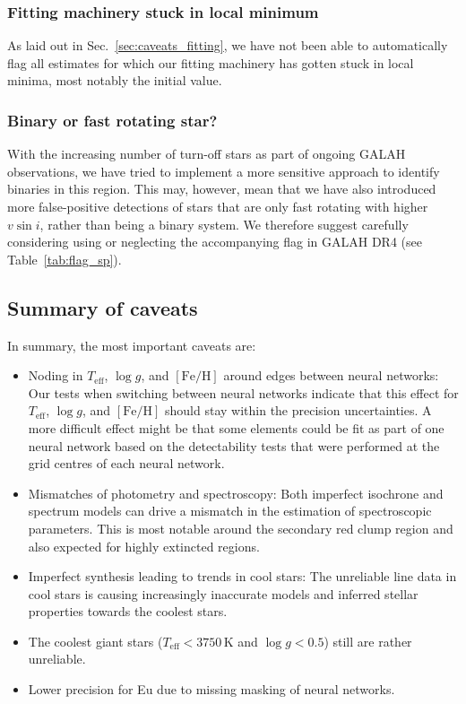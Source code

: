 \documentclass[
  journal=pasa,
  manuscript=research-paper, %
  year=2024,
  volume=37
]{cup-journal}
\newcommand{\Teff}{$T_\mathrm{eff}$\xspace}
\newcommand{\logg}{$\log g$\xspace}
\newcommand{\feh}{$\mathrm{[Fe/H]}$\xspace}
\newcommand{\vsini}{$v \sin i$\xspace}
\newcommand{\TLF}{\Teff, \logg, and \feh}
\begin{document}
\subsubsection{Fitting machinery stuck in local minimum}

As laid out in Sec.~\ref{sec:caveats_fitting}, we have not been able to automatically flag all estimates for which our fitting machinery has gotten stuck in local minima, most notably the initial value.

\subsubsection{Binary or fast rotating star?}

With the increasing number of turn-off stars as part of ongoing GALAH observations, we have tried to implement a more sensitive approach to identify binaries in this region. This may, however, mean that we have also introduced more false-positive detections of stars that are only fast rotating with higher \vsini, rather than being a binary system. We therefore suggest carefully considering using or neglecting the accompanying flag in GALAH DR4 (see Table~\ref{tab:flag_sp}).

\subsection{Summary of caveats} \label{sec:caveats_summary}

In summary, the most important caveats are:
\begin{itemize}
    \item Noding in \TLF around edges between neural networks: Our tests when switching between neural networks indicate that this effect for \TLF should stay within the precision uncertainties. A more difficult effect might be that some elements could be fit as part of one neural network based on the detectability tests that were performed at the grid centres of each neural network.
    \item Mismatches of photometry and spectroscopy: Both imperfect isochrone and spectrum models can drive a mismatch in the estimation of spectroscopic parameters. This is most notable around the secondary red clump region and also expected for highly extincted regions.
    \item Imperfect synthesis leading to trends in cool stars: The unreliable line data in cool stars is causing increasingly inaccurate models and inferred stellar properties towards the coolest stars.
    \item The coolest giant stars ($T_\mathrm{eff} < 3750\,\mathrm{K}$ and $\log g < 0.5$) still are rather unreliable.
    \item Lower precision for Eu due to missing masking of neural networks.
\end{itemize}
\end{document}
